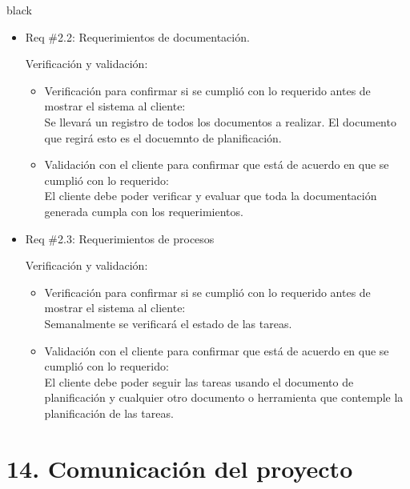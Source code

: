 \documentclass[11pt]{charter}
\begin{document}
\begin{consigna}{black}
\begin{itemize}
\begin{itemize}
\begin{itemize}
         \item Req \#2.2: Requerimientos de documentación.
         
         Verificación y validación:
         \begin{itemize}
         	\item Verificación para confirmar si se cumplió con lo requerido antes de mostrar el sistema al cliente:\\
         	Se llevará un registro de todos los documentos a realizar. El documento que regirá esto es el docuemnto de planificación.
         	\item Validación con el cliente para confirmar que está de acuerdo en que se cumplió con lo requerido:\\
         	El cliente debe poder verificar y evaluar que toda la documentación generada cumpla con los requerimientos.
         \end{itemize}
         
         \item Req \#2.3: Requerimientos de procesos
         
         Verificación y validación:
         \begin{itemize}
         	\item Verificación para confirmar si se cumplió con lo requerido antes de mostrar el sistema al cliente:\\
         	Semanalmente se verificará el estado de las tareas.
         	\item Validación con el cliente para confirmar que está de acuerdo en que se cumplió con lo requerido:\\
         	El cliente debe poder seguir las tareas usando el documento de planificación y cualquier otro documento o herramienta que contemple la planificación de las tareas. 
         \end{itemize}
         
		\end{itemize}
	    
	\end{itemize}

\end{itemize}

\end{consigna}

\section{14. Comunicación del proyecto}
\label{sec:comunicaciones}
\end{document}
